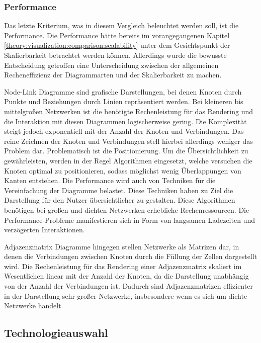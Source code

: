 \subsubsection{Performance}
\label{theory:visualization:comparison:performance}

Das letzte Kriterium, was in diesem Vergleich beleuchtet werden soll, ist die Performance. Die Performance hätte bereits im vorangegangenen Kapitel \ref{theory:visualization:comparison:scalability} unter dem Gesichtspunkt der Skalierbarkeit betrachtet werden können. Allerdings wurde die bewusste Entscheidung getroffen eine Unterscheidung zwischen der allgemeinen Recheneffizienz der Diagrammarten und der Skalierbarkeit zu machen.

Node-Link Diagramme sind grafische Darstellungen, bei denen Knoten durch Punkte und Beziehungen durch Linien repräsentiert werden. Bei kleineren bis mittelgroßen Netzwerken ist die benötigte Rechenleistung für das Rendering und die Interaktion mit diesen Diagrammen logischerweise gering. Die Komplexität steigt jedoch exponentiell mit der Anzahl der Knoten und Verbindungen. Das reine Zeichnen der Knoten und Verbindungen stell hierbei allerdings weniger das Problem dar. Problematisch ist die Positionierung. Um die Übersichtlichkeit zu gewährleisten, werden in der Regel Algorithmen eingesetzt, welche versuchen die Knoten optimal zu positionieren, sodass möglichst wenig Überlappungen von Kanten entstehen. Die Performance wird auch von Techniken für die Vereinfachung der Diagramme belastet. Diese Techniken haben zu Ziel die Darstellung für den Nutzer übersichtlicher zu gestalten.  Diese Algorithmen benötigen bei großen und dichten Netzwerken erhebliche Rechenressourcen. Die Performance-Probleme manifestieren sich in Form von langsamen Ladezeiten und verzögerten Interaktionen.

Adjazenzmatrix Diagramme hingegen stellen Netzwerke als Matrizen dar, in denen die Verbindungen zwischen Knoten durch die Füllung der Zellen dargestellt wird. Die Rechenleistung für das Rendering einer Adjazenzmatrix skaliert im Wesentlichen linear mit der Anzahl der Knoten, da die Darstellung unabhängig von der Anzahl der Verbindungen ist. Dadurch sind Adjazenzmatrizen effizienter in der Darstellung sehr großer Netzwerke, insbesondere wenn es sich um dichte Netzwerke handelt. 

\subsection{Technologieauswahl}
